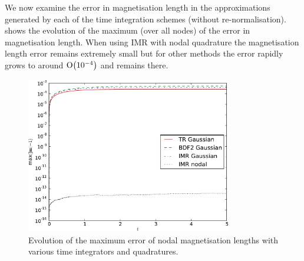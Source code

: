 We now examine the error in magnetisation length in the approximations generated by each of the time integration schemes (without re-normalisation).
 shows the evolution of the maximum (over all nodes) of the error in magnetisation length.
When using IMR with nodal quadrature the magnetisation length error remains extremely small but for other methods the error rapidly grows to around $\mathrm{O}{\left( 10^{-4} \right)}$ and remains there.
\begin{figure}
  \centering
  \includegraphics[width=0.8\textwidth]{plots/2d_wave_solution_m_length/mlengtherrormaxesvstimes.pdf}
  \caption{Evolution of the maximum error of nodal magnetisation lengths with various time integrators and quadratures.}
  \label{fig:mean-ml-error-2d}
\end{figure}

